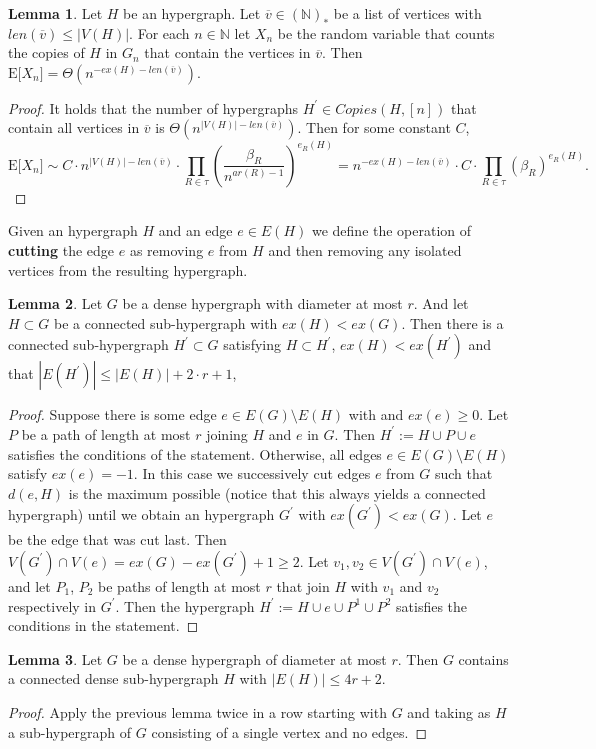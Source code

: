 \documentclass[12pt,notitlepage,a4paper]{article}
\theoremstyle{definition}
\newtheorem{lemma}{Lemma}[section]
\newcommand{\N}{\mathbb{N}}
\newcommand{\sep}{\noindent\rule{2cm}{0.4pt}}
\begin{document}
\begin{lemma}\label{lem:nocopiesfixed}
	Let $H$ be an hypergraph. Let
	$\overline{v}\in (\N)_*$ be a list of vertices
	with $len(\overline{v})\leq |V(H)|$.
	For each $n\in \N$ 
	let $X_n$ be the random variable that
	counts the copies of $H$ in $G_n$ that contain the vertices
	in $\overline{v}$. Then
	$
	\mathrm{E}\big[ X_n \big]=\Theta(n^{-ex(H)-len(\overline{v})})$.
\end{lemma}
\begin{proof}
	It holds that the number of hypergraphs $H^\prime \in Copies(H,[n])$
	that contain all vertices in $\overline{v}$ is
	 $\Theta\left(n^{|V(H)|-len(\overline{v})}\right)$. Then for
	 some constant $C$,
	\[
	\mathrm{E}\big[ X_n \big]\sim 
	C \cdot n^{|V(H)|-len(\overline{v})}
	\cdot\prod_{R\in\tau} \left( \frac{\beta_R}{n^{ar(R)-1}}\right)^{e_R(H)}=
	n^{-ex(H)-len(\overline{v})}\cdot C \cdot
	\prod_{R\in\tau} \left( \beta_R \right)^{e_R(H)}.
	\]
\end{proof}




	Given an hypergraph $H$ and an edge $e\in E(H)$ we
	define the operation of \textbf{cutting} the edge 
	$e$ as removing $e$ from $H$ and then removing any isolated
	vertices from the resulting hypergraph. \par

\begin{lemma}
	Let $G$ be a
	dense hypergraph with diameter at most $r$.
	And let $H\subset G$ be a connected 
	sub-hypergraph with $ex(H)<ex(G)$. Then
	there is a connected
	sub-hypergraph $H^\prime \subset G$
	satisfying $H\subset H^\prime$,
	$ex(H)<ex(H^\prime)$ and that 
	$|E(H^\prime)|\leq |E(H)|+2\cdot r + 1$, 
\end{lemma}
\begin{proof}
	Suppose there is some edge $e\in E(G)\setminus E(H)$ with
	and $ex(e)\geq 0$. Let $P$ be a path
	of length at most $r$ joining $H$ and $e$ in $G$. 
	Then $H^\prime:=H\cup P \cup e$ satisfies the conditions of 
	the statement. Otherwise, all edges $e\in E(G)\setminus E(H)$ 
	satisfy $ex(e)=-1$. In this case we successively cut
	edges $e$ from $G$ such that $d(e, H)$ is the maximum possible
	(notice that this always yields a connected hypergraph)
	until we obtain an hypergraph $G^\prime$ with $ex(G^\prime)<ex(G)$.
	Let $e$ be the edge that was cut last. Then $V(G^\prime)\cap V(e)=
	ex(G)-ex(G^\prime)+1 \geq 2$. Let $v_1, v_2\in V(G^\prime)\cap V(e)$,
	and let $P_1$, $P_2$ be paths of length at most $r$ that join $H$
	with $v_1$ and $v_2$ respectively in $G^\prime$. Then the hypergraph
	$H^\prime:=H\cup e \cup P^1 \cup P^2$ satisfies the conditions 
	in the statement. 
\end{proof}
\begin{lemma}
	Let $G$ be a
	dense hypergraph of diameter at most 
	$r$. Then $G$ contains a connected 
	dense sub-hypergraph $H$ 
	with $|E(H)|\leq 4r+2$. 
\end{lemma}
\begin{proof}
	Apply the previous lemma twice in a row starting with $G$ and taking
	as $H$ a sub-hypergraph of $G$ consisting of a single vertex and 
	no edges. 
\end{proof}
\end{document}
